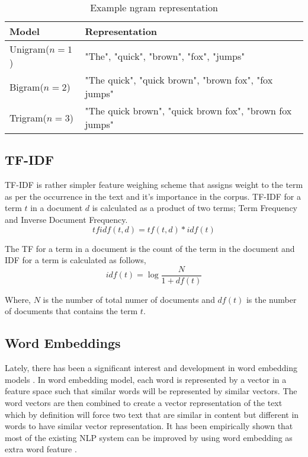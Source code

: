 \begin{table}[h]
\begin{center}
\caption{Example ngram representation}
\label{tbl:ngram_representation}
\begin{tabular}{p{3cm}p{8cm}}
\toprule 
Model&Representation\\
\midrule 
Unigram($n=1$)&"The", "quick", "brown", "fox", "jumps" \\
Bigram($n=2$)&"The quick", "quick brown", "brown fox", "fox jumps" \\
Trigram($n=3$)& "The quick brown", "quick brown fox", "brown fox jumps" \\
\bottomrule
\end{tabular}
\end{center}
\end{table}

\subsection{TF-IDF}
TF-IDF\cite{sparck1972statistical} is rather simpler feature weighing scheme that assigns weight to the term as per the occurrence in the text and it's importance in the corpus. TF-IDF for a term $t$ in a document $d$ is calculated as a product of two terms; Term Frequency and Inverse Document Frequency. 
\begin{equation}
    \label{eq:tf_idf_equation}
    tfidf(t, d) = tf(t, d) * idf(t)
\end{equation}

The TF for a term in a document is the count of the term in the document and IDF for a term is calculated as follows,
\begin{equation}
    \label{eq:idf_equation}
    idf(t) = \log{\frac{N}{1 + df(t)}}
\end{equation}

Where, $N$ is the number of total numer of documents and $df(t)$ is the number of documents that contains the term $t$.

\subsection{Word Embeddings}
Lately, there has been a significant interest and development in word embedding models \cite{mikolov2013distributed, pennington2014glove, bojanowski2017enriching}. In word embedding model, each word is represented by a vector in a feature space such that similar words will be represented by similar vectors\cite{goldberg2014word2vec}. The word vectors are then combined to create a vector representation of the text which by definition will force two text that are similar in content but different in words to have similar vector representation. It has been empirically shown that most of the existing NLP system can be improved by using word embedding as extra word feature \cite{turian2010word}.

